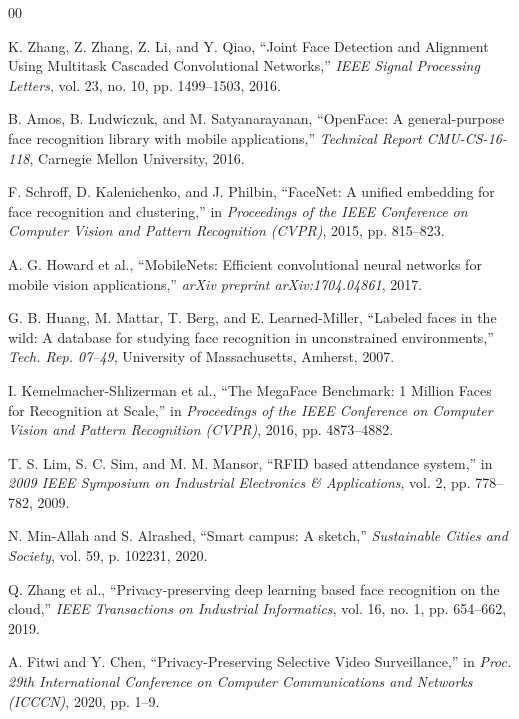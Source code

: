 \documentclass[conference]{IEEEtran}
\begin{document}
\begin{thebibliography}{00}

 K. Zhang, Z. Zhang, Z. Li, and Y. Qiao, ``Joint Face Detection and Alignment Using Multitask Cascaded Convolutional Networks,'' \textit{IEEE Signal Processing Letters}, vol. 23, no. 10, pp. 1499--1503, 2016.

 B. Amos, B. Ludwiczuk, and M. Satyanarayanan, ``OpenFace: A general-purpose face recognition library with mobile applications,'' \textit{Technical Report CMU-CS-16-118}, Carnegie Mellon University, 2016.

 F. Schroff, D. Kalenichenko, and J. Philbin, ``FaceNet: A unified embedding for face recognition and clustering,'' in \textit{Proceedings of the IEEE Conference on Computer Vision and Pattern Recognition (CVPR)}, 2015, pp. 815--823.

 A. G. Howard et al., ``MobileNets: Efficient convolutional neural networks for mobile vision applications,'' \textit{arXiv preprint arXiv:1704.04861}, 2017.

 G. B. Huang, M. Mattar, T. Berg, and E. Learned-Miller, ``Labeled faces in the wild: A database for studying face recognition in unconstrained environments,'' \textit{Tech. Rep. 07--49}, University of Massachusetts, Amherst, 2007.

 I. Kemelmacher-Shlizerman et al., ``The MegaFace Benchmark: 1 Million Faces for Recognition at Scale,'' in \textit{Proceedings of the IEEE Conference on Computer Vision and Pattern Recognition (CVPR)}, 2016, pp. 4873--4882.

 T. S. Lim, S. C. Sim, and M. M. Mansor, ``RFID based attendance system,'' in \textit{2009 IEEE Symposium on Industrial Electronics \& Applications}, vol. 2, pp. 778--782, 2009.

 N. Min-Allah and S. Alrashed, ``Smart campus: A sketch,'' \textit{Sustainable Cities and Society}, vol. 59, p. 102231, 2020.

 Q. Zhang et al., ``Privacy-preserving deep learning based face recognition on the cloud,'' \textit{IEEE Transactions on Industrial Informatics}, vol. 16, no. 1, pp. 654--662, 2019.

 A. Fitwi and Y. Chen, ``Privacy-Preserving Selective Video Surveillance,'' in \textit{Proc. 29th International Conference on Computer Communications and Networks (ICCCN)}, 2020, pp. 1--9.


\end{thebibliography}
\end{document}
